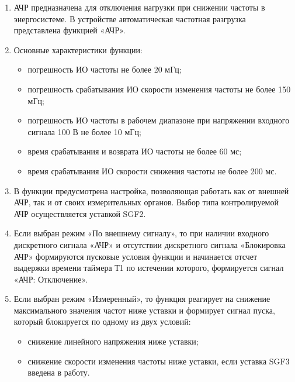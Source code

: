 
\color{black}

\begin{enumerate}

\item
АЧР предназначена для отключения нагрузки при снижении частоты в энергосистеме. В устройстве автоматическая частотная разгрузка представлена функцией «АЧР».

\item
Основные характеристики функции:
\begin{itemize}
    \item погрешность ИО частоты не более 20 мГц;
    \item погрешность срабатывания ИО скорости изменения частоты не более 150 мГц;
    \item погрешность ИО частоты в рабочем диапазоне при напряжении входного сигнала 100 В не более 10 мГц; 
    \item время срабатывания и возврата ИО частоты не более 60 мс;
    \item время срабатывания ИО скорости снижения частоты не более 200 мс.
\end{itemize}

\item
В функции предусмотрена настройка, позволяющая работать как от внешней АЧР, так и от своих измерительных органов. Выбор типа контролируемой АЧР осуществляется уставкой SGF2.

\item
Если выбран режим «По внешнему сигналу», то при наличии входного дискретного сигнала «АЧР» и отсутствии дискретного сигнала «Блокировка АЧР» формируются пусковые условия функции и начинается
отсчет выдержки времени таймера Т1 по истечении которого, формируется сигнал «АЧР: Отключение».

\item
Если выбран режим «Измеренный», то функция реагирует на снижение максимального значения частот ниже уставки и формирует сигнал пуска, который блокируется по одному из двух условий:
\begin{itemize}
    \item снижение линейного напряжения ниже уставки;
    \item снижение скорости изменения частоты ниже уставки, если уставка SGF3 введена в работу.
\end{itemize}


\end{enumerate}
